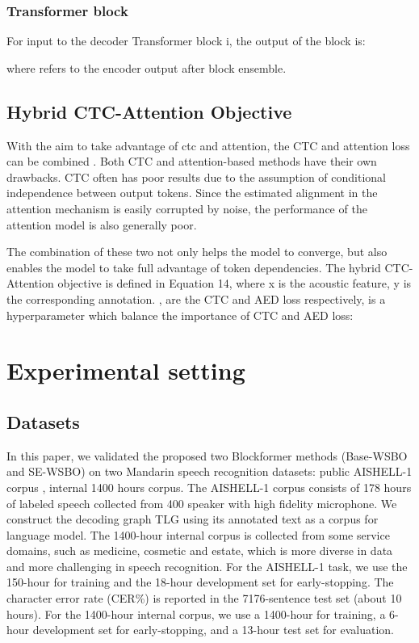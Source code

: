 \documentclass[a4paper]{article}
\begin{document}
\subsubsection{Transformer block}
For input 
to the decoder Transformer block i, the output  of the block is:



where  refers to the encoder output after block ensemble.



\subsection{ Hybrid CTC-Attention Objective}
With the aim to take advantage of ctc and attention, the CTC
and attention loss can be combined \cite{Watanabe2017HybridCA}. Both CTC and attention-based methods have their own drawbacks. CTC often has poor results due to the assumption of conditional independence between output tokens. Since the estimated alignment in the attention mechanism is easily corrupted by noise, the performance of the attention model is also generally poor.

The combination of these two not only helps the model to converge, but also enables the model to take full advantage of token dependencies.
The hybrid CTC-Attention objective is defined in Equation 14, where x is the acoustic feature, y is the corresponding annotation. , are the CTC and AED loss respectively,  is a hyperparameter which balance the importance of CTC and AED loss:




  





\section{Experimental setting}

\subsection{Datasets}
In this paper, we validated the proposed two Blockformer methods (Base-WSBO and SE-WSBO) on two Mandarin speech recognition datasets: public AISHELL-1 corpus \cite{Bu2017AISHELL1AO}, internal 1400 hours corpus.
The AISHELL-1 corpus consists of 178 hours of labeled speech collected from 400 speaker with high fidelity microphone. We construct the decoding graph TLG using its annotated text as a corpus for language model. The 1400-hour internal corpus is collected from some service domains, such as medicine, cosmetic and estate, which is more diverse in data and more challenging in speech recognition. For the AISHELL-1 task, we use the 150-hour for training and the 18-hour development set for early-stopping. 
The character error rate (CER\%) is reported in the 7176-sentence test set (about 10 hours). 
For the 1400-hour internal corpus, we use a 1400-hour for training, a 6-hour development set for early-stopping, and a 13-hour test set for evaluation.
\end{document}
